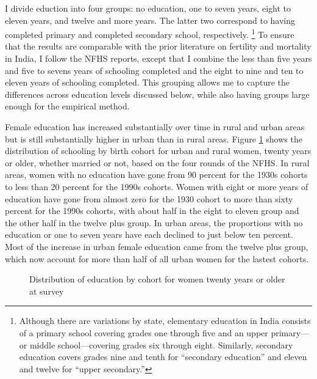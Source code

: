 \documentclass[12pt,letterpaper]{article}
\begin{document}
I divide eduction into four groups: no education, one to seven years, eight to eleven 
years, and twelve and more years.
The latter two correspond to having completed primary and completed secondary school, 
respectively.%
\footnote{
Although there are variations by state, elementary education in India consists of a 
primary school covering grades one through five and an upper primary---or middle 
school---covering grades six through eight. 
Similarly, secondary education covers grades nine and tenth for ``secondary education'' 
and eleven and twelve for ``upper secondary.''
}
To ensure that the results are comparable with the prior literature on fertility
and mortality in India, I follow the NFHS reports, except that I combine the 
less than five years and five to sevens years of schooling completed and the eight to nine 
and ten to eleven years of schooling completed.
This grouping allows me to capture the differences across education levels discussed below, 
while also having groups large enough for the empirical method.


Female education has increased substantially over time in rural and urban areas but 
is still substantially higher in urban than in rural areas.
Figure \ref{fig:education_over_time} shows the distribution of schooling by birth 
cohort for urban and rural women, 
twenty years or older, whether married or not, based on the four rounds of the NFHS.
In rural areas, women with no education have gone from 90 percent for the 1930s cohorts to 
less than 20 percent for the 1990s cohorts.
Women with eight or more years of education have gone from almost zero for the 1930 cohort 
to more than sixty percent for the 1990s cohorts, with about half in the eight to eleven 
group and the other half in the twelve plus group.
In urban areas, the proportions with no education or one to seven years have each declined 
to just below ten percent.
Most of the increase in urban female education came from the twelve plus group, which 
now account for more than half of all urban women for the lastest cohorts.

\begin{figure}[htpb]
\centering
{} 
\caption{Distribution of education by cohort for women twenty years or older at survey}
\label{fig:education_over_time}
\end{figure}
\end{document}

